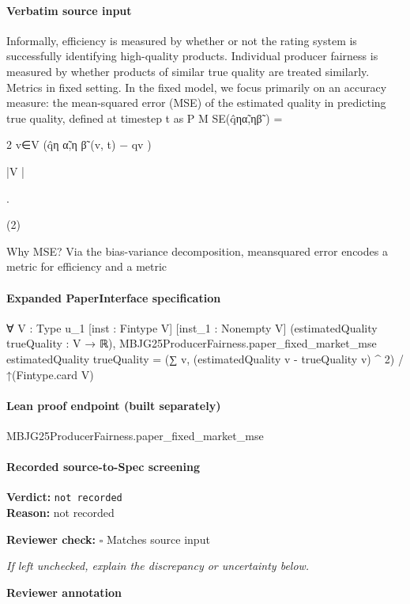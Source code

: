 \documentclass[10pt]{article}
\newcommand{\reviewerbox}{%
  \par\noindent\fbox{\parbox{0.96\linewidth}{\rule{0pt}{0.38in}}}\par
}
\newcommand{\reviewmatch}[1]{%
  \par\noindent\textbf{Reviewer check:} $\square$\; #1\par
  \noindent\emph{If left unchecked, explain the discrepancy or uncertainty below.}\par
}
\begin{document}
\paragraph{Verbatim source input}
\begin{ReviewVerbatim}
Informally, efficiency is measured by whether or not the rating system is successfully identifying high-quality products.
Individual producer fairness is measured by whether products of similar true quality are treated similarly.
Metrics in fixed setting. In the fixed model, we focus
primarily on an accuracy measure: the mean-squared error
(MSE) of the estimated quality in predicting true quality,
defined at timestep t as
P
M SE(q̂ηα̃,ηβ̃ ) =

2
v∈V (q̂η α̃,η β̃ (v, t) − qv )

|V |

.

(2)

Why MSE? Via the bias-variance decomposition, meansquared error encodes a metric for efficiency and a metric
\end{ReviewVerbatim}


\paragraph{Expanded PaperInterface specification}
\begin{ReviewVerbatim}
∀ {V : Type u_1} [inst : Fintype V] [inst_1 : Nonempty V] (estimatedQuality trueQuality : V → ℝ),
  MBJG25ProducerFairness.paper_fixed_market_mse estimatedQuality trueQuality =
    (∑ v, (estimatedQuality v - trueQuality v) ^ 2) / ↑(Fintype.card V)
\end{ReviewVerbatim}

\paragraph{Lean proof endpoint (built separately)}\begin{ReviewVerbatim}
MBJG25ProducerFairness.paper_fixed_market_mse
\end{ReviewVerbatim}

\paragraph{Recorded source-to-Spec screening}
\textbf{Verdict:} \texttt{not recorded}
\\
\textbf{Reason:} not recorded
\reviewmatch{Matches source input}
\noindent\textbf{Reviewer annotation}\par
\reviewerbox
\clearpage
\hypertarget{source-claim-da6d1b14c0df1e3e}{}
\end{document}
